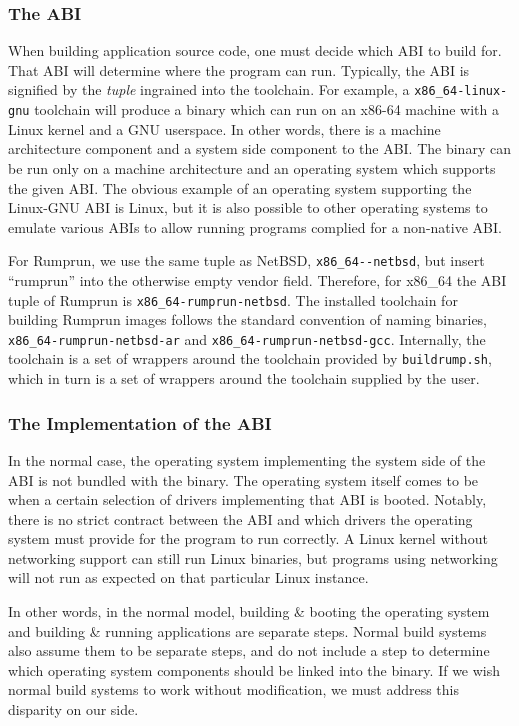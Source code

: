\subsubsection*{The ABI}

When building application source code, one must decide which ABI to
build for.  That ABI will determine where the program can run.  Typically,
the ABI is signified by the \textit{tuple} ingrained into the toolchain.
For example, a \verb+x86_64-linux-gnu+ toolchain will produce a
binary which can run on an x86-64 machine with a Linux kernel and a GNU
userspace.  In other words, there is a machine architecture component
and a system side component to the ABI.  The binary can be run only on a
machine architecture and an operating system which supports the given ABI.
The obvious example of an operating system supporting the Linux-GNU ABI
is Linux, but it is also possible to other operating systems to emulate
various ABIs to allow running programs complied for a non-native ABI.

For Rumprun, we use the same tuple as NetBSD, \eg \verb+x86_64--netbsd+,
but insert ``rumprun'' into the otherwise empty vendor field.  Therefore,
for x86\_64 the ABI tuple of Rumprun is \verb+x86_64-rumprun-netbsd+.
The installed toolchain for building Rumprun images follows the standard
convention of naming binaries, \eg \verb+x86_64-rumprun-netbsd-ar+
and \verb+x86_64-rumprun-netbsd-gcc+.  Internally, the toolchain is a
set of wrappers around the toolchain provided by \texttt{buildrump.sh}, which in
turn is a set of wrappers around the toolchain supplied by the user.


\subsubsection*{The Implementation of the ABI}

In the normal case, the operating system implementing the system side
of the ABI is not bundled with the binary.  The operating system itself
comes to be when a certain selection of drivers implementing that ABI
is booted.  Notably, there is no strict contract between the ABI and
which drivers the operating system must provide for the program to
run correctly.  A Linux kernel without networking support can still run
Linux binaries, but programs using networking will not run as expected
on that particular Linux instance.

In other words, in the normal model, building \& booting the operating
system and building \& running applications are separate steps.  Normal build
systems also assume them to be separate steps, and do not include a step
to determine which operating system components should be linked into the
binary.  If we wish normal build systems to work without modification,
we must address this disparity on our side.


